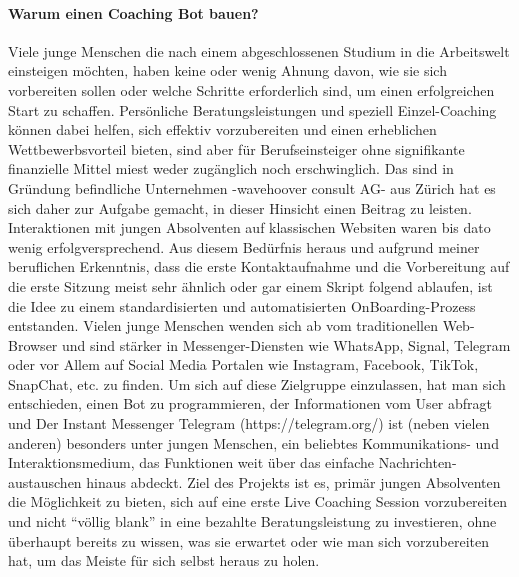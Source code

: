 \paragraph{Warum einen Coaching Bot bauen?}
Viele junge Menschen die nach einem abgeschlossenen Studium in die Arbeitswelt einsteigen möchten, haben keine oder wenig Ahnung davon, wie sie sich vorbereiten sollen oder welche Schritte erforderlich sind, um einen erfolgreichen Start zu schaffen. Persönliche Beratungsleistungen und speziell Einzel-Coaching können dabei helfen, sich effektiv vorzubereiten und einen erheblichen Wettbewerbsvorteil bieten, sind aber für Berufseinsteiger ohne signifikante finanzielle Mittel miest weder zugänglich noch erschwinglich.
Das sind in Gründung befindliche Unternehmen -wavehoover consult AG- aus Zürich hat es sich daher zur Aufgabe gemacht, in dieser Hinsicht einen Beitrag zu leisten. Interaktionen mit jungen Absolventen auf klassischen Websiten waren bis dato wenig erfolgversprechend. 
Aus diesem Bedürfnis heraus und aufgrund meiner beruflichen Erkenntnis, dass die erste Kontaktaufnahme und die Vorbereitung auf die erste Sitzung meist sehr ähnlich oder gar einem Skript folgend ablaufen, ist die Idee zu einem standardisierten und automatisierten OnBoarding-Prozess entstanden.
Vielen junge Menschen wenden sich ab vom traditionellen Web-Browser und sind stärker in Messenger-Diensten wie WhatsApp, Signal, Telegram oder vor Allem auf Social Media Portalen wie Instagram, Facebook, TikTok, SnapChat, etc. zu finden. Um sich auf diese Zielgruppe einzulassen, hat man sich entschieden, einen Bot zu programmieren, der Informationen vom User abfragt und
Der Instant Messenger Telegram (https://telegram.org/) ist (neben vielen anderen) besonders unter jungen Menschen, ein beliebtes Kommunikations- und Interaktionsmedium, das Funktionen weit über das einfache Nachrichten-austauschen hinaus abdeckt.
Ziel des Projekts ist es, primär jungen Absolventen die Möglichkeit zu bieten, sich auf eine erste Live Coaching Session vorzubereiten und nicht “völlig blank” in eine bezahlte Beratungsleistung zu investieren, ohne überhaupt bereits zu wissen, was sie erwartet oder wie man sich vorzubereiten hat, um das Meiste für sich selbst heraus zu holen.
